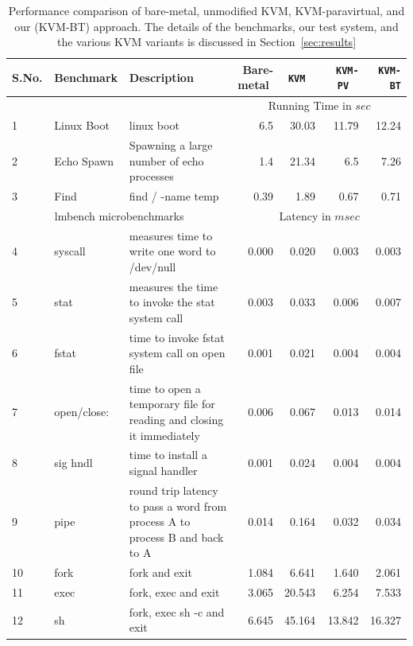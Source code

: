 \documentclass[10pt,twocolumn]{article}
\begin{document}
\begin{table}
\centering
      \begin{tabular}{|l| l|p{5cm} | r r r r|} \hline
        S.No.\verb, ,&  Benchmark\verb, ,& Description  & Bare-metal \verb, ,& {\tt KVM} \verb, , & {\tt KVM-PV} \verb, ,& {\tt KVM-BT} \\ \hline

     &&& \multicolumn{4}{c|}{ Running Time in $sec$}\\\cline {4-7}  
      1&  Linux Boot& linux boot & 6.5	&	30.03	&	11.79	&	12.24 \\ \hline
      2& Echo Spawn	& Spawning a large number of echo processes&1.4	&	21.34	&	6.5	&	7.26\\\hline
      3& Find	& find / -name temp & 0.39	&	1.89	&	0.67	&	0.71 \\ \hline
	   \multicolumn{3}{|c|}{ lmbench microbenchmarks }& \multicolumn{4}{c|}{Latency in $msec$}\\  \hline

4	&	syscall	&	 measures time to write one word to /dev/null	&	0.000	&	0.020	&	0.003	&	0.003	\\	\hline
5	&	stat	&	 measures the time to invoke the stat system call	&	0.003	&	0.033	&	0.006	&	0.007	\\	\hline
6	&	fstat	&	time to invoke fstat system call on open file 	&	0.001	&	0.021	&	0.004	&	0.004	\\	\hline
7	&	open/close:	&	 time to open a temporary file for reading and closing it immediately 	&	0.006	&	0.067	&	0.013	&	0.014	\\	\hline
8	&	sig hndl	&	 time to install a signal handler	&	0.001	&	0.024	&	0.004	&	0.004	\\	\hline
9	&	pipe 	&	 round trip latency to pass a word from process A to process B and back to A	&	0.014	&	0.164	&	0.032	&	0.034	\\	\hline
10	&	fork	&	 fork and exit 	&	1.084	&	6.641	&	1.640	&	2.061	\\	\hline
11	&	exec	&	 fork, exec and exit	&	3.065	&	20.543	&	6.254	&	7.533	\\	\hline
12	&	sh	&	 fork, exec sh -c and exit	&	6.645	&	45.164	&	13.842	&	16.327	\\	\hline



        \hline
      \end{tabular}
\caption{Performance comparison of bare-metal, unmodified KVM, KVM-paravirtual, and our (KVM-BT) approach. The details of
the benchmarks, our test system, and the various KVM variants is discussed in Section~\ref{sec:results}}
\label{tab:kvm_performance}
\end{table} 
\end{document}
